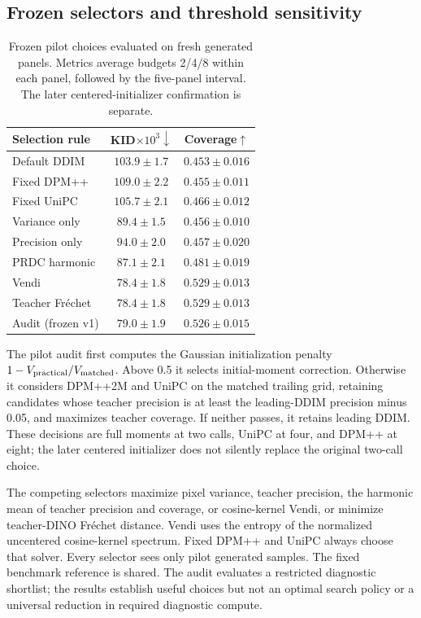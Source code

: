 \subsection{Frozen selectors and threshold sensitivity}
\begin{table}[t]
\centering
\small
\setlength{\tabcolsep}{3.5pt}
\caption{Frozen pilot choices evaluated on fresh generated panels. Metrics average budgets 2/4/8 within each panel, followed by the five-panel interval. The later centered-initializer confirmation is separate.}
\label{tab:cifar_selection}
\begin{tabular}{lcc}
\toprule
Selection rule & KID$\times10^3\downarrow$ & Coverage$\uparrow$ \\
\midrule
Default DDIM & $103.9\pm1.7$ & $0.453\pm0.016$ \\
Fixed DPM++ & $109.0\pm2.2$ & $0.455\pm0.011$ \\
Fixed UniPC & $105.7\pm2.1$ & $0.466\pm0.012$ \\
Variance only & $89.4\pm1.5$ & $0.456\pm0.010$ \\
Precision only & $94.0\pm2.0$ & $0.457\pm0.020$ \\
PRDC harmonic & $87.1\pm2.1$ & $0.481\pm0.019$ \\
Vendi & $78.4\pm1.8$ & $0.529\pm0.013$ \\
Teacher Fr\'echet & $78.4\pm1.8$ & $0.529\pm0.013$ \\
Audit (frozen v1) & $79.0\pm1.9$ & $0.526\pm0.015$ \\
\bottomrule
\end{tabular}
\end{table}
The pilot audit first computes the Gaussian initialization penalty
$1-V_{\rm practical}/V_{\rm matched}$. Above 0.5 it selects initial-moment
correction. Otherwise it considers DPM++2M and UniPC on the matched trailing
grid, retaining candidates whose teacher precision is at least the
leading-DDIM precision minus 0.05, and maximizes teacher coverage. If neither
passes, it retains leading DDIM. These decisions are full moments at two calls,
UniPC at four, and DPM++ at eight; the later centered initializer does not
silently replace the original two-call choice.

The competing selectors maximize pixel variance, teacher precision, the harmonic
mean of teacher precision and coverage, or cosine-kernel Vendi, or minimize
teacher-DINO Fr\'echet distance. Vendi uses the entropy of the normalized
uncentered cosine-kernel spectrum. Fixed DPM++ and UniPC always choose that
solver. Every selector sees only pilot generated samples. The fixed benchmark
reference is shared. The audit evaluates a restricted diagnostic shortlist;
the results establish useful choices but not an optimal search policy or
a universal reduction in required diagnostic compute.

